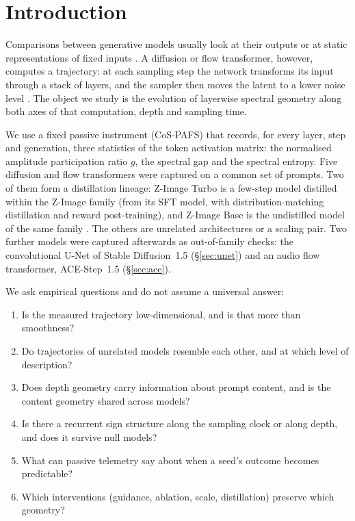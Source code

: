 \documentclass[11pt]{article}
\begin{document}
\tableofcontents
\newpage

\section{Introduction}\label{sec:intro}

Comparisons between generative models usually look at their outputs or at static representations of fixed inputs \citep{raghu2017svcca,kornblith2019similarity}. A diffusion or flow transformer, however, computes a trajectory: at each sampling step the network transforms its input through a stack of layers, and the sampler then moves the latent to a lower noise level \citep{ho2020denoising,song2021scorebased,lipman2023flow,liu2023flow}. The object we study is the evolution of layerwise spectral geometry along both axes of that computation, depth and sampling time.

We use a fixed passive instrument (CoS-PAFS) that records, for every layer, step and generation, three statistics of the token activation matrix: the normalised amplitude participation ratio $g$, the spectral gap and the spectral entropy. Five diffusion and flow transformers were captured on a common set of prompts. Two of them form a distillation lineage: Z-Image Turbo is a few-step model distilled within the Z-Image family (from its SFT model, with distribution-matching distillation and reward post-training), and Z-Image Base is the undistilled model of the same family \citep{zimageteam2025zimage,liu2025decoupled,tongyi2026zimage}. The others are unrelated architectures or a scaling pair. Two further models were captured afterwards as out-of-family checks: the convolutional U-Net of Stable Diffusion~1.5 (\S\ref{sec:unet}) and an audio flow transformer, ACE-Step~1.5 (\S\ref{sec:ace}).

We ask empirical questions and do not assume a universal answer:
\begin{enumerate}
 \item Is the measured trajectory low-dimensional, and is that more than smoothness?
 \item Do trajectories of unrelated models resemble each other, and at which level of description?
 \item Does depth geometry carry information about prompt content, and is the content geometry shared across models?
 \item Is there a recurrent sign structure along the sampling clock or along depth, and does it survive null models?
 \item What can passive telemetry say about when a seed's outcome becomes predictable?
 \item Which interventions (guidance, ablation, scale, distillation) preserve which geometry?
\end{enumerate}
\end{document}
